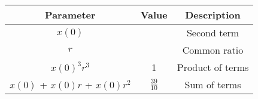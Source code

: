 \begin{tabular}{|c|c|c|}
        \hline
        \textbf{Parameter} & \textbf{Value} & \textbf{Description} \\
        \hline
        $x(0)$ & & Second term \\
        \hline
        $r$ & & Common ratio \\
        \hline
        $x(0)^3r^3$ & 1 & Product of terms \\
        \hline
        $x(0)$ + $x(0)r$ + $x(0)r^2$ & $\frac{39}{10}$ & Sum of terms \\
        \hline
    \end{tabular}
